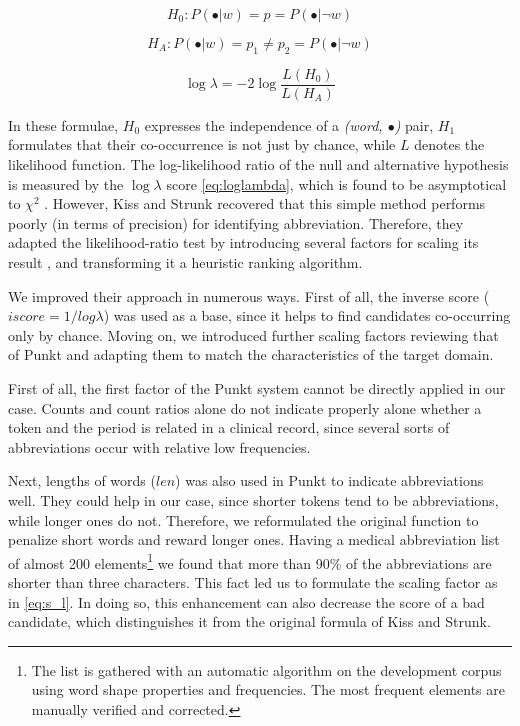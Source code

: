 \begin{equation} \label{eq:h0}
H_0: P(\bullet|w) = p = P(\bullet|\neg w)
\end{equation}

\begin{equation} \label{eq:ha}
H_A: P(\bullet|w) = p_1 \neq p_2 = P(\bullet|\neg w) 
\end{equation}

\begin{equation} \label{eq:loglambda}
\log \lambda = -2 \log \frac{L(H_0)}{L(H_A)}
\end{equation}


In these formulae, $H_0$ expresses the independence of a \emph{(word, $\bullet$)} pair, $H_1$ formulates that their co-occurrence is not just by chance, while $L$ denotes the likelihood function. 
The log-likelihood ratio of the null and alternative hypothesis is measured by the $\log \lambda$ score \eqref{eq:loglambda}, which is found to be asymptotical to $\chi^2$ \cite{dunning1993accurate}. %
However, Kiss and Strunk recovered that this simple method performs poorly (in terms of precision) for identifying abbreviation.
Therefore, they adapted the likelihood-ratio test by introducing several factors for scaling its result \cite{kiss2006unsupervised}, and transforming it a heuristic ranking algorithm.

We improved their approach in numerous ways. 
First of all, the inverse score ($iscore=1/log\lambda$) was used as a base, since it helps to find candidates co-occurring only by chance. 
Moving on, we introduced further scaling factors reviewing that of Punkt and adapting them to match the characteristics of the target domain.

First of all, the first factor of the Punkt system cannot be directly applied in our case.
Counts and count ratios alone do not indicate properly alone whether a token and the period is related in a clinical record, since several sorts of abbreviations occur with relative low frequencies. 


Next, lengths of words ($len$) was also used in Punkt to indicate abbreviations well. 
They could help in our case, since shorter tokens tend to be abbreviations, while longer ones do not. 
Therefore, we reformulated the original function to penalize short words and reward longer ones. 
Having a medical abbreviation list of almost 200 \label{sec:abbrev} elements\footnote{The list is gathered with an automatic algorithm on the development corpus using word shape properties and frequencies. The most frequent elements are manually verified and corrected.} 
we found that more than 90\% of the abbreviations are shorter than three characters. 
This fact led us to formulate the scaling factor as in \eqref{eq:s_l}. 
In doing so, this enhancement can also decrease the score of a bad candidate, which distinguishes it from the original formula of Kiss and Strunk.

